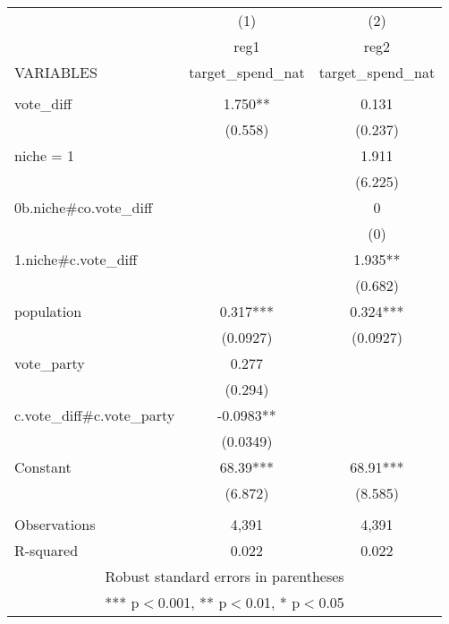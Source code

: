 \documentclass[]{article}
\begin{document}
\begin{tabular}{lcc} \hline
 & (1) & (2) \\
 & reg1 & reg2 \\
VARIABLES & target\_spend\_nat & target\_spend\_nat \\ \hline
 &  &  \\
vote\_diff & 1.750** & 0.131 \\
 & (0.558) & (0.237) \\
niche = 1 &  & 1.911 \\
 &  & (6.225) \\
0b.niche\#co.vote\_diff &  & 0 \\
 &  & (0) \\
1.niche\#c.vote\_diff &  & 1.935** \\
 &  & (0.682) \\
population & 0.317*** & 0.324*** \\
 & (0.0927) & (0.0927) \\
vote\_party & 0.277 &  \\
 & (0.294) &  \\
c.vote\_diff\#c.vote\_party & -0.0983** &  \\
 & (0.0349) &  \\
Constant & 68.39*** & 68.91*** \\
 & (6.872) & (8.585) \\
 &  &  \\
Observations & 4,391 & 4,391 \\
 R-squared & 0.022 & 0.022 \\ \hline
\multicolumn{3}{c}{ Robust standard errors in parentheses} \\
\multicolumn{3}{c}{ *** p$<$0.001, ** p$<$0.01, * p$<$0.05} \\
\end{tabular}
\end{document}
